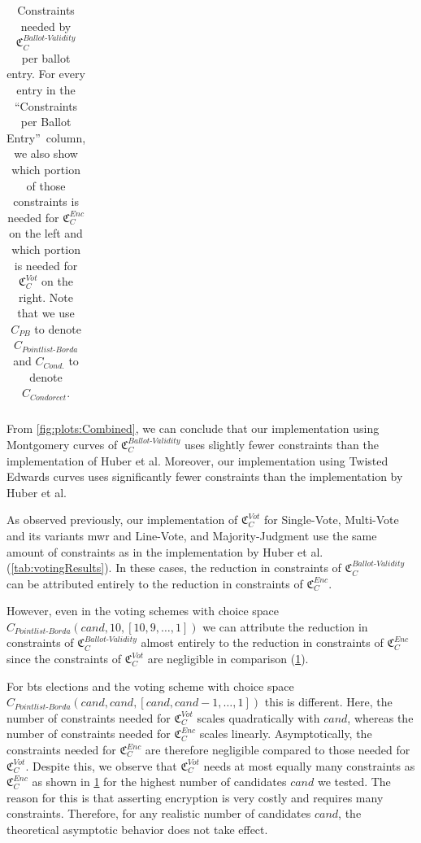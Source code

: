 \begin{table}[h]
\begin{tabular}{|l|c|cccccc|}
    \end{tabular}
    \renewcommand{\arraystretch}{1.0}
    \caption{Constraints needed by $\mathfrak{C}_{C}^{Ballot\text{-}Validity}$ per ballot entry.
    For every entry in the ``Constraints per Ballot Entry''\ column, we also show which portion of those constraints is needed for $\mathfrak{C}_C^{Enc}$ on the left and which portion is needed for $\mathfrak{C}_C^{Vot}$ on the right.
    Note that we use $C_{PB}$ to denote $C_{Pointlist\text{-}Borda}$ and $C_{Cond.}$ to denote $C_{Condorcet}$.\\
    }
    \label{tab:combinedResults}
\end{table}

From \cref{fig:plots:Combined}, we can conclude that our implementation using Montgomery curves of $\mathfrak{C}_C^{Ballot\text{-}Validity}$ uses slightly fewer constraints than the implementation of Huber et al.
Moreover, our implementation using Twisted Edwards curves uses significantly fewer constraints than the implementation by Huber et al.

As observed previously, our implementation of $\mathfrak{C}_C^{Vot}$ for Single-Vote, Multi-Vote and its variants \gls{mwr} and Line-Vote, and Majority-Judgment use the same amount of constraints as in the implementation by Huber et al. (\cref{tab:votingResults}).
In these cases, the reduction in constraints of $\mathfrak{C}_C^{Ballot\text{-}Validity}$ can be attributed entirely to the reduction in constraints of $\mathfrak{C}_C^{Enc}$.

However, even in the voting schemes with choice space $C_{Pointlist\text{-}Borda}(cand, 10, [10, 9, \dots, 1])$ we can attribute the reduction in constraints of $\mathfrak{C}_C^{Ballot\text{-}Validity}$ almost entirely to the reduction in constraints of $\mathfrak{C}_C^{Enc}$ since the constraints of $\mathfrak{C}_C^{Vot}$ are negligible in comparison (\cref{tab:combinedResults}).

For \gls{bts} elections and the voting scheme with choice space \\$C_{Pointlist\text{-}Borda}(cand, cand, [cand, cand-1, \dots, 1])$ this is different.
Here, the number of constraints needed for $\mathfrak{C}_C^{Vot}$ scales quadratically with $cand$, whereas the number of constraints needed for $\mathfrak{C}_C^{Enc}$ scales linearly.
Asymptotically, the constraints needed for $\mathfrak{C}_C^{Enc}$ are therefore negligible compared to those needed for $\mathfrak{C}_C^{Vot}$.
Despite this, we observe that $\mathfrak{C}_C^{Vot}$ needs at most equally many constraints as $\mathfrak{C}_C^{Enc}$ as shown in \cref{tab:combinedResults} for the highest number of candidates $cand$ we tested.
The reason for this is that asserting encryption is very costly and requires many constraints.
Therefore, for any realistic number of candidates $cand$, the theoretical asymptotic behavior does not take effect.

